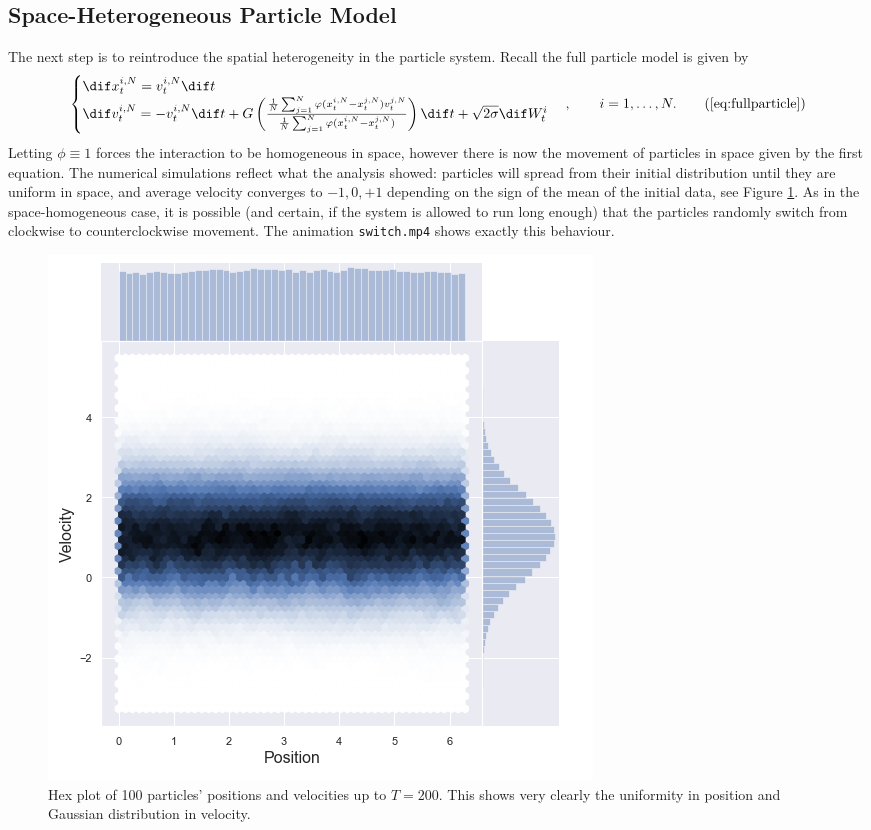 \subsection{Space-Heterogeneous Particle Model}\label{sec:hetkin}
    The next step is to reintroduce the spatial heterogeneity in the particle system. Recall the full particle model is given by
            \begin{equation}\begin{cases}
    \dif x^{i,N}_t = v^{i,N}_t\dif t\\
    \dif v^{i,N}_t = -v^{i,N}_t\dif t + G\left(\frac{\frac{1}{N}\sum_{j=1}^N \phi(x_t^{i,N} - x_t^{j,N})v^{j,N}_t  }{\frac{1}{N}\sum_{j=1}^N \phi(x_t^{i,N} - x_t^{j,N})}\right)\dif t + \sqrt{2\sigma} \dif W^i_t 
    \end{cases}, \qquad  i = 1,\dots,N.\tag{\ref{eq:fullparticle}}
    \end{equation} 
    Letting $\phi\equiv 1$ forces the interaction to be homogeneous in space, however there is now the movement of particles in space given by the first equation. The numerical simulations reflect what the analysis showed: particles will spread from their initial distribution until they are uniform in space, and average velocity converges to $-1, 0, +1$ depending on the sign of the mean of the initial data, see Figure \ref{fig:hetjointplot}. As in the space-homogeneous case, it is possible (and certain, if the system is allowed to run long enough) that the particles randomly switch from clockwise to counterclockwise movement. The animation \texttt{switch.mp4} shows exactly this behaviour.
    \begin{figure}
        \centering
        \includegraphics[width=0.7\linewidth]{Figures/hetjointplot}
        \caption[Joint Plot showing marginals of space-heterogeneous particle model]{Hex plot of 100 particles' positions and velocities up to $T=200$. This shows very clearly the uniformity in position and Gaussian distribution in velocity.}
        \label{fig:hetjointplot}
    \end{figure}

